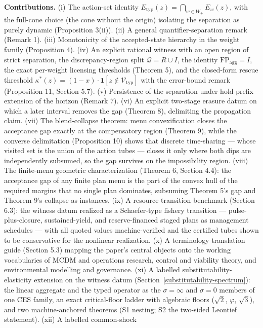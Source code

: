 \documentclass[3p,11pt]{elsarticle}
\begin{document}
\textbf{Contributions.} (i) The action-set identity \(E_{\mathrm{typ}}(z) = \bigcap_{w \in W_+} E_w(z)\), with the full-cone
choice (the cone without the origin) isolating the separation as purely
dynamic (Proposition 3(ii)). (ii) A general quantifier-separation remark
(Remark 1). (iii) Monotonicity of the accepted-state hierarchy in the
weight family (Proposition 4). (iv) An explicit rational witness with an
open region of strict separation, the discrepancy-region split
\(\mathcal{Q} = R \cup I\), the identity
\(\mathrm{FP}_{\mathrm{agg}} = I\), the exact per-weight licensing thresholds (Theorem 5), and the closed-form rescue threshold \(\kappa^*(z) = (1 - x)\cdot\mathbf{1}[z \notin \mathcal{V}_{\mathrm{typ}}]\) with the error-bound remark (Proposition 11, Section 5.7). (v) Persistence of the separation under
hold-prefix extension of the horizon (Remark 7). (vi) An explicit
two-stage erasure datum on which a later interval removes the gap
(Theorem 8), delimiting the propagation claim. (vii) The blend-collapse
theorem: menu convexification closes the acceptance gap exactly at the compensatory region (Theorem 9), while the converse
delimitation (Proposition 10) shows that discrete time-sharing --- whose
visited set is the union of the action tubes --- closes it only where
both dips are independently subsumed, so the gap survives on the
impossibility region. (viii) The finite-menu geometric characterization
(Theorem 6, Section 4.4): the acceptance gap of any finite plan menu is
the part of the convex hull of the required margins that no single plan
dominates, subsuming Theorem 5's gap and Theorem 9's collapse as
instances. (ix) A resource-transition benchmark
(Section 6.3): the witness datum realized as a Schaefer-type fishery
transition --- pulse-plus-closure, sustained-yield, and reserve-financed
staged plans as management schedules --- with all quoted values
machine-verified and the certified tubes shown to be conservative for the
nonlinear realization. (x) A terminology translation guide (Section 5.3)
mapping the paper's central objects onto the working vocabularies of MCDM
and operations research, control and viability theory, and environmental
modelling and governance. (xi) A labelled substitutability-elasticity
extension on the witness datum (Section~\ref{substitutability-spectrum}):
the linear aggregate and the typed operator as the \(\sigma = \infty\)
and \(\sigma = 0\) members of one CES family, an exact critical-floor
ladder with algebraic floors (\(\sqrt{2}\), \(\varphi\),
\(\sqrt{3}\)), and two machine-anchored theorems (S1 nesting; S2 the
two-sided Leontief statement). (xii) A labelled common-shock
\end{document}
